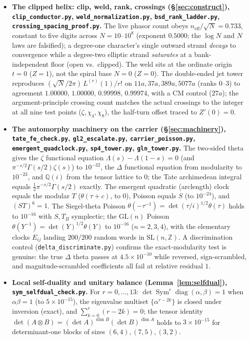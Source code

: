 \documentclass[11pt]{article}
\theoremstyle{definition}
\newcommand{\Sym}{\operatorname{Sym}}
\begin{document}
\begin{itemize}
\item \textbf{The clipped helix: clip, weld, rank, crossings (\S\ref{sec:construct}),
\texttt{clip\_conductor.py}, \texttt{weld\_normalization.py}, \texttt{bsd\_rank\_ladder.py},
\texttt{crossing\_spacing\_proof.py}.} The live phasor count obeys $n_{\mathrm{eff}}/\sqrt N=0.733$,
constant to five digits across $N=10$–$10^8$ (exponent $0.5000$; the $\log N$ and $N$ laws are
falsified); a degree-one character's single outward strand \emph{decays} to convergence while a
degree-two elliptic strand \emph{saturates} at a bank-independent floor (open vs.\ clipped). The weld
sits at the ordinate origin $t=0$ ($Z=1$), not the spiral base $N=0$ ($Z=0$). The double-ended jet
tower reproduces $(\sqrt N/2\pi)\,L^{(r)}(1)/r!$ on $11a,37a,389a,5077a$ (ranks $0$–$3$) to agreement
$1.00000,\,1.00000,\,0.99998,\,0.99974$, with a CM control ($27a$); the argument-principle crossing
count matches the actual crossings to the integer at all nine test points ($\zeta,\chi_4,\chi_8$), the
half-turn offset traced to $Z'(0)=0$.

\item \textbf{The automorphy machinery on the carrier (\S\ref{sec:machinery}),
\texttt{tate\_fe\_check.py}, \texttt{gl2\_escalate.py}, \texttt{carrier\_poisson.py},
\texttt{emergent\_quadclock.py}, \texttt{sp4\_tower.py}, \texttt{gln\_tower.py}.} The two-sided theta
gives the $\zeta$ functional equation $\Lambda(s)-\Lambda(1-s)=0$ (and $\pi^{-s/2}\Gamma(s/2)\zeta(s)$)
to $10^{-32}$, the $\Delta$ functional equation from modularity to $10^{-23}$, and $\mathbb Q(i)$ from
the tensor lattice to $0$; the Tate archimedean integral equals $\tfrac12\pi^{-s/2}\Gamma(s/2)$
exactly. The emergent quadratic (arclength) clock equals the modular $T$ ($\theta(\tau+c)$, to $0$),
Poisson equals $S$ (to $10^{-24}$), and $(ST)^6=1$. The Siegel-theta Poisson $\theta(-\tau^{-1})=
\det(\tau/i)^{1/2}\theta(\tau)$ holds to $10^{-16}$ with $S,T_B$ symplectic; the $\mathrm{GL}(n)$
Poisson $\theta(Y^{-1})=\det(Y)^{1/2}\theta(Y)$ to $10^{-16}$ ($n=2,3,4$), with the elementary clocks
$E_{ij}$ landing $200/200$ random words in $\mathrm{SL}(n,\mathbb Z)$. A discrimination control
(\texttt{delta\_discriminate.py}) confirms the exact-modularity test is genuine: the true $\Delta$
theta passes at $4.5\times10^{-10}$ while reversed, sign-scrambled, and magnitude-scrambled
coefficients all fail at relative residual $1$.

\item \textbf{Local self-duality and unitary balance (Lemma~\ref{lem:selfdual}), \texttt{sym\_selfdual\_check.py}.}
For $r=0,\dots,13$: $\det\Sym^r\operatorname{diag}(\alpha,\beta)=1$ when $\alpha\beta=1$ (to $5\times10^{-15}$),
the eigenvalue multiset $\{\alpha^{r-2k}\}$ is closed under inversion (exact), and $\sum_{k=0}^r(r-2k)=0$;
the tensor identity $\det(A\otimes B)=(\det A)^{\dim B}(\det B)^{\dim A}$ holds to $3\times10^{-15}$ for
determinant-one blocks of sizes $(6,4),(7,5),(3,2)$.


\end{itemize}
\end{document}
